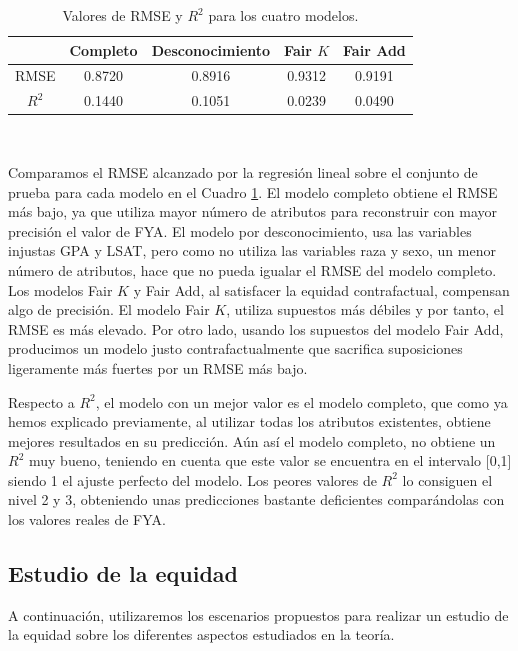 \documentclass[oneside,openright,titlepage,numbers=noenddot,openany,headinclude,footinclude=true,
cleardoublepage=empty,abstractoff,BCOR=5mm,paper=a4,fontsize=12pt,main=spanish]{scrreprt}
\begin{document}
\begin{table}[h]
\centering
\resizebox{12.1cm}{!} {
\begin{tabular}{ccccc}
\hline
      & \textbf{Completo} & \textbf{Desconocimiento} & \textbf{Fair $K$} & \textbf{Fair Add} \\ \hline
RMSE  & 0.8720         & 0.8916                   & 0.9312            & 0.9191            \\ \hline
$R^2$ & 0.1440         & 0.1051                   & 0.0239            & 0.0490            \\ \hline
\end{tabular}
}
\caption{Valores de RMSE y $R^2$ para los cuatro modelos.}
\label{tab:coeficientes}
\end{table}\

Comparamos el RMSE alcanzado por la regresión lineal sobre el conjunto de prueba para cada modelo en el Cuadro \ref{tab:coeficientes}. El modelo completo obtiene el RMSE más bajo, ya que utiliza mayor número de atributos para reconstruir con mayor precisión el valor de FYA. El modelo por desconocimiento, usa las variables injustas GPA y LSAT, pero como no utiliza las variables raza y sexo, un menor número de atributos, hace que no pueda igualar el RMSE del modelo completo. Los modelos Fair $K$ y Fair Add, al satisfacer la equidad contrafactual, compensan algo de precisión. El modelo Fair $K$, utiliza supuestos más débiles y por tanto, el RMSE es más elevado. Por otro lado, usando los supuestos del modelo Fair Add, producimos un modelo justo contrafactualmente que sacrifica suposiciones ligeramente más fuertes por un RMSE más bajo. 

Respecto a $R^2$, el modelo con un mejor valor es el modelo completo, que como ya hemos explicado previamente, al utilizar todas los atributos existentes, obtiene mejores resultados en su predicción. Aún así el modelo completo, no obtiene un $R^2$ muy bueno, teniendo en cuenta que este valor se encuentra en el intervalo [0,1] siendo 1 el ajuste perfecto del modelo. Los peores valores de $R^2$ lo consiguen el nivel 2 y 3, obteniendo unas predicciones bastante deficientes comparándolas con los valores reales de FYA.

\subsection{Estudio de la equidad}

A continuación, utilizaremos los escenarios propuestos para realizar un estudio de la equidad sobre los diferentes aspectos estudiados en la teoría. 
\end{document}
